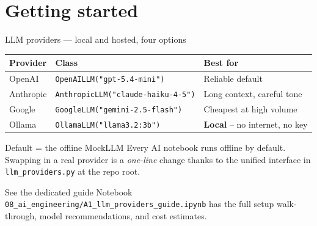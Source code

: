 \documentclass[aspectratio=169,11pt]{beamer}
\begin{document}
\section{Getting started}

\begin{frame}{LLM providers — local and hosted, four options}
  \footnotesize
  \begin{tabular}{lll}
    \toprule
    \textbf{Provider} & \textbf{Class} & \textbf{Best for} \\
    \midrule
    OpenAI    & \texttt{OpenAILLM("gpt-5.4-mini")}            & Reliable default \\
    Anthropic & \texttt{AnthropicLLM("claude-haiku-4-5")}    & Long context, careful tone \\
    Google    & \texttt{GoogleLLM("gemini-2.5-flash")}       & Cheapest at high volume \\
    Ollama    & \texttt{OllamaLLM("llama3.2:3b")}            & \textbf{Local} -- no internet, no key \\
    \bottomrule
  \end{tabular}
  \vspace{6pt}
  \begin{block}{Default = the offline MockLLM}
    Every AI notebook runs offline by default. Swapping in a real provider is a
    \emph{one-line} change thanks to the unified interface in
    \texttt{llm\_providers.py} at the repo root.
  \end{block}
  \vspace{4pt}
  \begin{exampleblock}{See the dedicated guide}
    Notebook \texttt{08\_ai\_engineering/A1\_llm\_providers\_guide.ipynb} has the
    full setup walk-through, model recommendations, and cost estimates.
  \end{exampleblock}
\end{frame}
\end{document}
